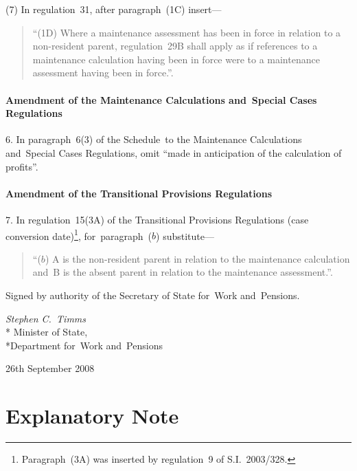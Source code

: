 \documentclass[12pt,a4paper]{article}
\begin{document}
(7) In regulation~31, after paragraph~(1C) insert—
\begin{quotation}
“(1D) Where a maintenance assessment has been in force in relation to a non-resident parent, regulation~29B shall apply as if references to a maintenance calculation having been in force were to a maintenance assessment having been in force.”.
\end{quotation}

\subsection[6. Amendment of the Maintenance Calculations and~Special Cases Regulations]{Amendment of the Maintenance Calculations and~Special Cases Regulations}

6.  In paragraph~6(3) of the Schedule~to the Maintenance Calculations and~Special Cases Regulations, omit “made in anticipation of the calculation of profits”.

\subsection[7. Amendment of the Transitional Provisions Regulations]{Amendment of the Transitional Provisions Regulations}

7.  In regulation~15(3A) of the Transitional Provisions Regulations (case conversion date)\footnote{Paragraph~(3A) was inserted by regulation~9 of S.I.~2003/328.}, for~paragraph~($b$)  substitute—
\begin{quotation}
“($b$) A is the non-resident parent in relation to the maintenance calculation and~B is the absent parent in relation to the maintenance assessment.”.
\end{quotation}

\bigskip

Signed 
by authority of the 
Secretary of State for~Work and~Pensions.

{\raggedleft
\emph{Stephen C.~Timms}\\*
Minister
of State,\\*Department for~Work and~Pensions

}

26th September 2008

\small

\part{Explanatory Note}
\end{document}
